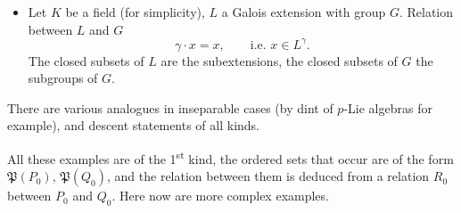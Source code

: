 \documentclass[11pt]{article}
\newcommand{\printedpage}[1]{\marginpar{\footnotesize p.~#1}}
\newcommand{\msp}[1]{\marginpar{\footnotesize [#1]}}
\newcommand{\Pf}{\mathfrak{P}}
\begin{document}
\printedpage{49}

\begin{itemize}[leftmargin=2.5em]
\item[5)] Let $K$ be a field (for simplicity), $L$ a Galois extension with group $G$. Relation between $L$ and $G$
\[
\gamma\cdot x=x,\qquad \text{i.e. } x\in L^{\gamma}.
\]
The closed subsets of $L$ are the subextensions, the closed subsets of $G$ the subgroups of $G$.
\end{itemize}

There are various analogues in inseparable cases (by dint of $p$-Lie algebras for example), and descent statements of all kinds.

\msp{page 80}All these examples are of the 1\textsuperscript{st} kind, the ordered sets that occur are of the form $\Pf(P_0)$, $\Pf(Q_0)$, and the relation between them is deduced from a relation $R_0$ between $P_0$ and $Q_0$. Here now are more complex examples.
\end{document}
